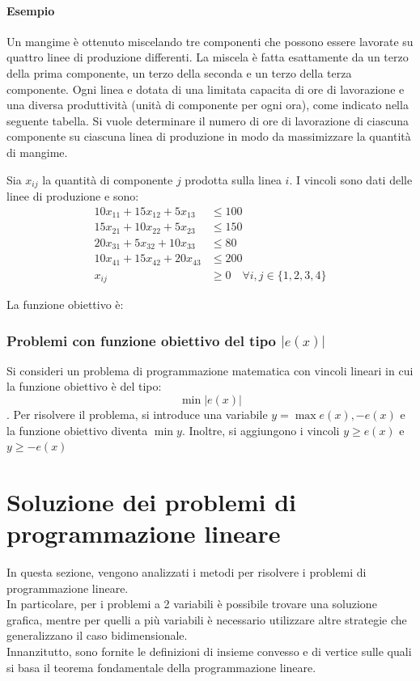 \documentclass{article}
\begin{document}
\paragraph{Esempio}
Un mangime è ottenuto miscelando tre componenti che possono essere lavorate
su quattro linee di produzione differenti. La miscela è fatta esattamente da un
terzo della prima componente, un terzo della seconda e un terzo della terza
componente. Ogni linea e dotata di una limitata capacita di ore di lavorazione e
una diversa produttività (unità di componente per ogni ora), come indicato nella 
seguente tabella. Si vuole determinare il numero di ore di lavorazione di 
ciascuna componente su ciascuna linea di produzione in modo da massimizzare la
quantità di mangime.

Sia $x_{ij}$ la quantità di componente $j$ prodotta sulla linea $i$.
I vincoli sono dati delle linee di produzione e sono:
\begin{align*}
  10x_{11} + 15x_{12} + 5x_{13} &\leq 100\\ 
  15x_{21} + 10x_{22} + 5x_{23} &\leq 150\\ 
  20x_{31} + 5x_{32} + 10x_{33} &\leq 80\\ 
  10x_{41} + 15x_{42} + 20x_{43} &\leq 200\\ 
  x_{ij} &\geq 0 \quad \forall i,j \in \{1,2,3,4\}
\end{align*}

La funzione obiettivo è:

\subsubsection{Problemi con funzione obiettivo del tipo $ |e(x)|$}
Si consideri un problema di programmazione matematica con vincoli lineari in 
cui la funzione obiettivo è del tipo: $$\min |e(x)|$$. Per risolvere il 
problema, si introduce una variabile $y = \max{e(x), -e(x)}$ e la funzione 
obiettivo diventa $\min y$. Inoltre, si aggiungono i vincoli $y \geq e(x)$ e 
$y \geq -e(x)$

\section{Soluzione dei problemi di programmazione lineare}
In questa sezione, vengono analizzati i metodi per risolvere i problemi di 
programmazione lineare. \\ In particolare, per i problemi a 2 variabili
è possibile trovare una soluzione grafica, mentre per quelli a
più variabili è necessario utilizzare altre strategie che generalizzano
il caso bidimensionale.\\ 
Innanzitutto, sono fornite le definizioni di insieme convesso e di vertice 
sulle quali si basa il teorema fondamentale della programmazione lineare.
\end{document}
